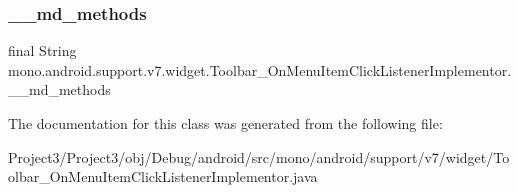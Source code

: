 \subsubsection{\texorpdfstring{\+\_\+\+\_\+md\+\_\+methods}{\_\_md\_methods}}
{\footnotesize\ttfamily final String mono.\+android.\+support.\+v7.\+widget.\+Toolbar\+\_\+\+On\+Menu\+Item\+Click\+Listener\+Implementor.\+\_\+\+\_\+md\+\_\+methods\hspace{0.3cm}{\ttfamily [static]}}



The documentation for this class was generated from the following file\+:\begin{DoxyCompactItemize}
\item 
Project3/\+Project3/obj/\+Debug/android/src/mono/android/support/v7/widget/Toolbar\+\_\+\+On\+Menu\+Item\+Click\+Listener\+Implementor.\+java\end{DoxyCompactItemize}

